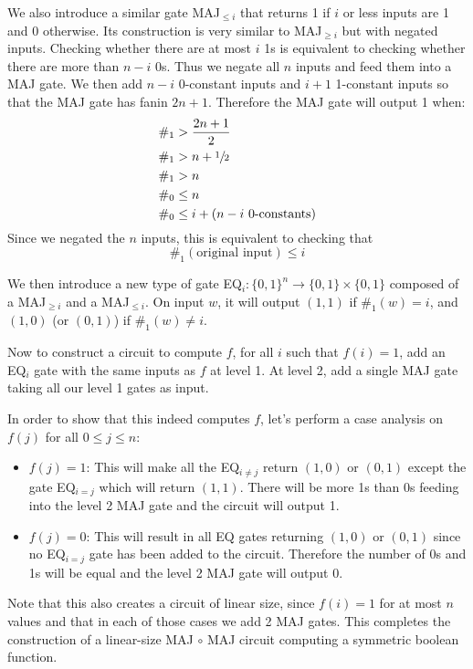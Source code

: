 \documentclass{article}
\begin{document}
We also introduce a similar gate MAJ$_{\leq i}$ that returns 1 if $i$ or less inputs are 1 and 0 otherwise. Its construction is very similar to MAJ$_{\geq i}$ but with negated inputs. Checking whether there are at most $i$ 1s is equivalent to checking whether there are more than $n-i$ 0s. Thus we negate all $n$ inputs and feed them into a MAJ gate. We then add $n-i$ 0-constant inputs and $i+1$ 1-constant inputs so that the MAJ gate has fanin $2n+1$. Therefore the MAJ gate will output 1 when:
\begin{align*}
\#_1 &> \frac{2n+1}{2} \\
\#_1 &> n + \sfrac{1}{2} \\
\#_1 &> n \\
\#_0 &\leq n \\ 
\#_0 &\leq i + (n-i \text{ 0-constants})
\end{align*}
Since we negated the $n$ inputs, this is equivalent to checking that $$\#_1(\text{original input}) \leq i$$

We then introduce a new type of gate EQ$_i:\{0,1\}^n\rightarrow\{0,1\}\times\{0,1\}$ composed of a MAJ$_{\geq i}$ and a MAJ$_{\leq i}$. On input $w$, it will output $(1,1)$ if $\#_1(w)=i$, and $(1,0)$ (or $(0,1)$) if $\#_1(w)\not=i$.

Now to construct a circuit to compute $f$, for all $i$ such that $f(i)=1$, add an EQ$_i$ gate with the same inputs as $f$ at level 1.  At level 2, add a single MAJ gate taking all our level 1 gates as input.

In order to show that this indeed computes $f$, let's perform a case analysis on $f(j)$ for all $0\leq j \leq n$:
\begin{itemize}
\item $f(j)=1$: This will make all the EQ$_{i\not=j}$ return $(1,0)$ or $(0,1)$ except the gate EQ$_{i=j}$ which will return $(1,1)$. There will be more 1s than 0s feeding into the level 2 MAJ gate and the circuit will output 1.

\item $f(j)=0$: This will result in all EQ gates returning $(1,0)$ or $(0,1)$ since no EQ$_{i=j}$ gate has been added to the circuit. Therefore the number of 0s and 1s will be equal and the level 2 MAJ gate will output 0.

\end{itemize}

Note that this also creates a circuit of linear size, since $f(i)=1$ for at most $n$ values and that in each of those cases we add 2 MAJ gates. This completes the construction of a linear-size MAJ $\circ$ MAJ circuit computing a symmetric boolean function. 
\end{document}
